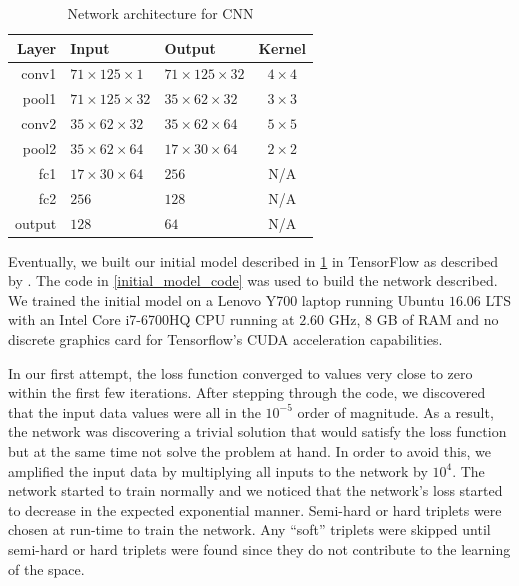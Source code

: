 \begin{table}[!ht]
	\centering
	\small
	\caption{Network architecture for CNN}
	\begin{tabular}{rllc}
		\toprule
		Layer  & Input                       & Output                      & Kernel         \\ \midrule
		conv1  & $ 71 \times 125 \times 1 $  & $ 71 \times 125 \times 32 $ & $ 4 \times 4 $ \\
		pool1  & $ 71 \times 125 \times 32 $ & $ 35 \times 62 \times 32 $  & $ 3 \times 3 $ \\
		conv2  & $ 35 \times 62 \times 32  $ & $ 35 \times 62 \times 64 $  & $ 5 \times 5 $ \\
		pool2  & $ 35 \times 62 \times 64 $  & $17 \times 30 \times 64$    & $ 2 \times 2 $ \\
		fc1    & $17 \times 30 \times 64$    & $ 256          $            & N/A            \\
		fc2    & $ 256 $                     & $ 128 $                     & N/A            \\
		output & $ 128 $                     & $ 64   $                    & N/A            \\ \bottomrule
	\end{tabular}
	\label{tab:network}
\end{table}

Eventually, we built our initial model described in \cref{tab:network} in TensorFlow as described by \citet{tensorflow}. The  code in \cref{initial_model_code} was used to build the network described. We trained the initial model on a Lenovo Y700 laptop running Ubuntu $16.06$ LTS with an Intel Core i7-6700HQ CPU running at $2.60$ GHz, $8$ GB of RAM and no discrete graphics card for Tensorflow's CUDA acceleration capabilities. 

In our first attempt, the loss function converged to values very close to zero within the first few iterations. After stepping through the code, we discovered that the input data values were all in the $10^{-5}$ order of magnitude. As a result, the network was discovering a trivial solution that would satisfy the loss function but at the same time not solve the problem at hand. In order to avoid this, we amplified the input data by multiplying all inputs to the network by $10^4$. The network started to train normally and we noticed that the network's loss started to decrease in the expected exponential manner. Semi-hard or hard triplets were chosen at run-time to train the network. Any ``soft'' triplets were skipped until semi-hard or hard triplets were found since they do not contribute to the learning of the space. 

